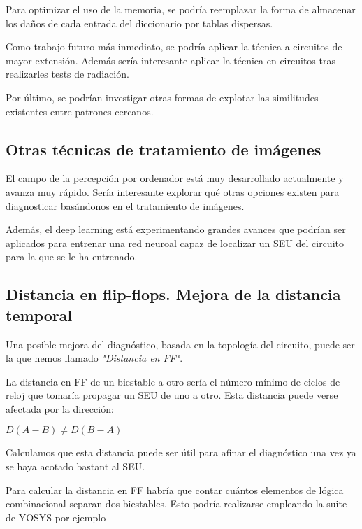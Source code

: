 Para optimizar el uso de la memoria, se podría reemplazar la forma de almacenar
los daños de cada entrada del diccionario por tablas dispersas.

Como trabajo futuro más inmediato, se podría aplicar la técnica a circuitos de
mayor extensión. Además sería interesante aplicar la técnica en circuitos tras
realizarles tests de radiación.

Por último, se podrían investigar otras formas de explotar las similitudes
existentes entre patrones cercanos.

\subsection{Otras técnicas de tratamiento de imágenes}
\label{subsec:OtrasTecnicasImag}
El campo de la percepción por ordenador está muy desarrollado actualmente y avanza
muy rápido. Sería interesante explorar qué otras opciones existen para
diagnosticar basándonos en el tratamiento de imágenes.



Además, el deep learning está experimentando grandes avances que podrían ser
aplicados para entrenar una red neuroal capaz de localizar un \gls{SEU} del
circuito para la que se le ha entrenado.


\subsection{Distancia en flip-flops. Mejora de la distancia temporal}
\label{subsec:FFdist}
Una posible mejora del diagnóstico, basada en la topología del circuito, puede ser
la que hemos llamado \textit{"Distancia en FF"}.

La distancia en \gls{FF} de un biestable a otro sería el número mínimo de ciclos
de reloj que tomaría propagar un \gls{SEU} de uno a otro. Esta distancia puede
verse afectada por la dirección: 

\begin{center}
    $D(A-B) \neq D(B-A)$
\end{center}

Calculamos que esta distancia puede ser útil para afinar el diagnóstico una vez ya
se haya acotado bastant al \gls{SEU}.

Para calcular la distancia en FF habría que contar cuántos elementos de lógica
combinacional separan dos biestables. Esto podría realizarse empleando la suite de 
YOSYS por ejemplo %

\endinput
